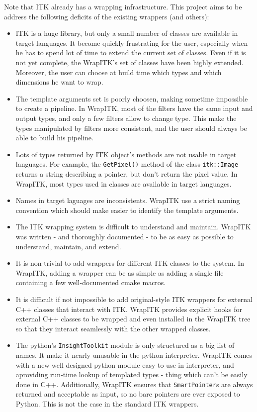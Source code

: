 \documentclass{InsightArticle}
\begin{document}
Note that ITK already has a wrapping infrastructure. This project aims to be
address the following deficits of the existing wrappers (and others):
\begin{itemize}
  \item  ITK is a huge library, but only a small number of classes are available
in target languages. It become quickly frustrating for the user, especially when
he has to spend lot of time to extend the current set of classes. Even if it is
not yet complete, the WrapITK's set of classes have been highly extended. Moreover,
the user can choose at build time which types and which dimensions he want to wrap.

  \item  The template arguments set is poorly choosen, making sometime impossible
to create a pipeline. In WrapITK, most of the filters have the same input and output
types, and only a few filters allow to change type. This make the types manipulated 
by filters more consistent, and the user should always be able to build his pipeline.

  \item  Lots of types returned by ITK object's methods are not usable in target
languages. For example, the \verb$GetPixel()$ method of the class \verb$itk::Image$
returns a string describing a pointer, but don't return the pixel value. In WrapITK,
most types used in classes are available in target languages.

  \item  Names in target laguages are inconsistents. WrapITK use a strict naming
convention which should make easier to identify the template arguments.

  \item  The ITK wrapping system is difficult to understand and maintain. WrapITK was
written - and thoroughly documented - to be as easy as possible to understand,
maintain, and extend.

  \item  It is non-trivial to add wrappers for different ITK classes to the system. In
WrapITK, adding a wrapper can be as simple as adding a single file containing a
few well-documented cmake macros.

  \item  It is difficult if not impossible to add original-style ITK wrappers for
external C++ classes that interact with ITK. WrapITK provides explicit hooks for
external C++ classes to be wrapped and even installed in the WrapITK tree so
that they interact seamlessly with the other wrapped classes.

  \item  The python's \verb$InsightToolkit$ module is only structured as a big
list of names. It make it nearly unusable in the python interpreter. WrapITK
comes with a new well designed python module easy to use in interpreter, and
aproviding run-time lookup of templated types - thing which can't be easily done
in C++. Additionally, WrapITK ensures that \verb$SmartPointer$s are always
returned and acceptable as input, so no bare pointers are ever exposed to
Python. This is not the case in the standard ITK wrappers.

\end{itemize}
\end{document}
